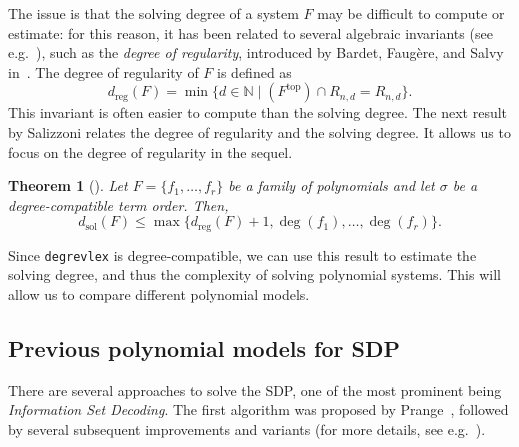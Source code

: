 \documentclass[11pt]{article}
\newcommand{\N}[0]{\mathbb{N}}
\theoremstyle{plain}
\newtheorem{theo}{Theorem}[section]
\theoremstyle{definition}
\theoremstyle{remark}
\begin{document}
The issue is that the solving degree of a system $F$ may be difficult to compute or estimate: for this reason, it has been related to several algebraic invariants (see e.g.~\cite{CAMINATA2023322}), such as the \textit{degree of regularity}, introduced by Bardet, Faugère, and Salvy in~\cite{Faugre2004OnTC}. The degree of regularity of $F$ is defined as
\begin{equation*}
    d_{\operatorname{reg}}(F)=\min\{d\in\N\mid (F^{\operatorname{top}})\cap R_{n,d}=R_{n,d}\}.
\end{equation*}
This invariant is often easier to compute than the solving degree. The next result by Salizzoni relates the degree of regularity and the solving degree. It allows us to focus on the degree of regularity in the sequel.
\begin{theo}[{\cite[Theorem 1]{salizzoni2023upperboundsolvingdegree}}]\label{thm:salizz}
    Let $F=\{f_1,\dots,f_r\}$ be a family of polynomials and let $\sigma$ be a degree-compatible term order. Then,
    \begin{equation*}
        d_{\operatorname{sol}}(F)\leq \operatorname{max}\{d_{\operatorname{reg}}(F)+1,\operatorname{deg}(f_1),\dots,\operatorname{deg}(f_r)\}.
    \end{equation*}    
\end{theo}
Since \texttt{degrevlex} is degree-compatible, we can use this result to estimate the solving degree, and thus the complexity of solving polynomial systems. This will allow us to compare different polynomial models. 

\subsection{Previous polynomial models for SDP}
There are several approaches to solve the SDP, one of the most prominent being \textit{Information Set Decoding}. The first algorithm was proposed by Prange~\cite{Prange1962TheUO}, followed by several subsequent improvements and variants (for more details, see e.g.~\cite{weger2024surveycodebasedcryptography}). 
\end{document}
